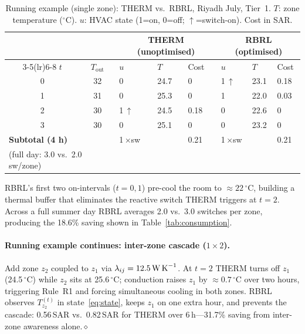 \documentclass[12pt,a4paper]{article}
\newcommand{\Tout}{T_{\mathrm{out}}}
\newcommand{\lij}{\lambda_{ij}}
\begin{document}
\begin{table}[!t]
\centering
\caption{Running example (single zone): THERM vs.\ RBRL, Riyadh July,
Tier~1. $T$: zone temperature ($^\circ$C). $u$: HVAC state
(1=on, 0=off; $\uparrow$=switch-on). Cost in SAR.}
\label{tab:example}
\setlength{\tabcolsep}{3.5pt}
\begin{tabularx}{\linewidth}{@{}ccXXXXXX@{}}
\toprule
& & \multicolumn{3}{c}{\textbf{THERM (unoptimised)}}
  & \multicolumn{3}{c}{\textbf{RBRL (optimised)}} \\
\cmidrule(lr){3-5}\cmidrule(lr){6-8}
$t$ & $\Tout$ & $u$ & $T$ & Cost & $u$ & $T$ & Cost \\
\midrule
0 & 32 & 0 & 24.7 & 0    & 1\,$\uparrow$ & 23.1 & 0.18 \\
1 & 31 & 0 & 25.3 & 0    & 1             & 22.0 & 0.03 \\
2 & 30 & 1\,$\uparrow$ & 24.5 & 0.18 & 0 & 22.6 & 0 \\
3 & 30 & 0 & 25.1 & 0    & 0             & 23.2 & 0    \\
\midrule
\multicolumn{2}{l}{\textbf{Subtotal (4 h)}}
  & 1\,$\times$sw & & 0.21 & 1\,$\times$sw & & 0.21 \\
\multicolumn{2}{l}{\footnotesize(full day: 3.0 vs.\ 2.0 sw/zone)} & & & & & & \\
\bottomrule
\end{tabularx}
\end{table}

RBRL's first two on-intervals ($t=0,1$) pre-cool the room to
$\approx22\,^\circ$C, building a thermal buffer that eliminates the
reactive switch THERM triggers at $t=2$.
Across a full summer day RBRL averages 2.0 vs.\ 3.0 switches per zone,
producing the 18.6\% saving shown in Table~\ref{tab:consumption}.

\paragraph{Running example continues: inter-zone cascade ($1\times2$).}%
\label{subsec:running_ex}
Add zone $z_2$ coupled to $z_1$ via $\lij=12.5\,\text{W\,K}^{-1}$.
At $t=2$ THERM turns off $z_1$ (24.5\,$^\circ$C) while $z_2$ sits at
25.6\,$^\circ$C; conduction raises $z_1$ by $\approx0.7\,^\circ$C
over two hours, triggering Rule~R1 and forcing simultaneous cooling in
both zones.
RBRL observes $T_{z_2}^{(t)}$ in state~\eqref{eq:state}, keeps $z_1$
on one extra hour, and prevents the cascade: 0.56\,SAR vs.\ 0.82\,SAR
for THERM over 6\,h---31.7\% saving from inter-zone awareness alone.\hfill$\diamond$
\end{document}
